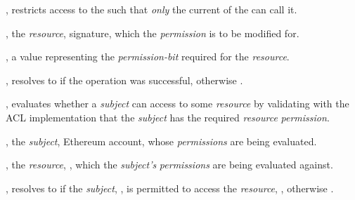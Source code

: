 \begin{code}
\begin{functions}
      \begin{modifiers}
        \item {}, restricts access to the
           such that \emph{only} the current  of the
           can call it.
      \end{modifiers}

      \begin{parameters}
        \item {}, the \emph{resource}, 
          signature, which the \emph{permission} is to be modified for.

        \item {}, a  value representing the
          \emph{permission-bit} required for the \emph{resource}.
      \end{parameters}

      \begin{returns}
        \item {}, resolves to  if the operation was
          successful, otherwise .
      \end{returns}


    \item {}, evaluates
      whether a \emph{subject} can access to some \emph{resource} by validating
      with the ACL implementation that the \emph{subject} has the required
      \emph{resource} \emph{permission}.

      \begin{parameters}
        \item {}, the \emph{subject}, Ethereum account,
          whose \emph{permissions} are being evaluated.

        \item {}, the \emph{resource}, , which the \emph{subject's} \emph{permissions} are being
          evaluated against.
      \end{parameters}

      \begin{returns}
        \item {}, resolves to  if the
          \emph{subject}, , is permitted to access the
          \emph{resource}, , otherwise .
      \end{returns}



\end{functions}
\end{code}
